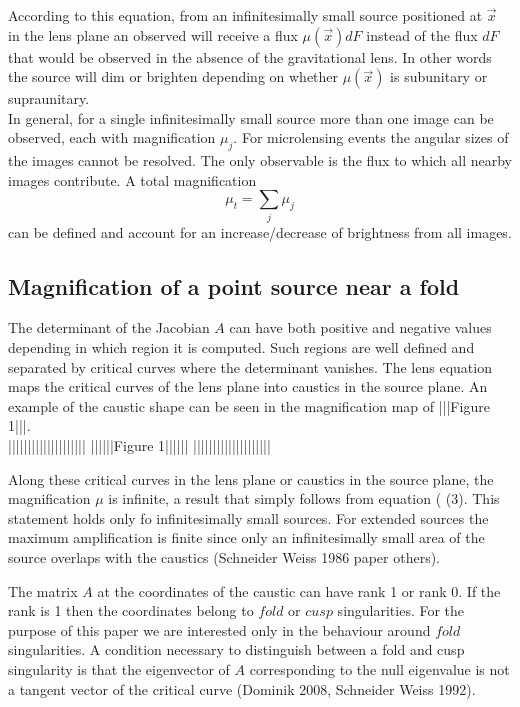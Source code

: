 According to this equation, from an infinitesimally small source positioned at $\vec{x}$ in the lens plane an observed will receive a flux $\mu(\vec{x}) dF$ instead of the flux $dF$ that would be
observed in the absence of the gravitational lens. In other words the source will dim or brighten depending on whether $\mu(\vec{x})$ is subunitary or supraunitary.\\

In general, for a single infinitesimally small source more than one image can be observed, each with magnification $\mu_j$. For microlensing events the angular sizes of the
images cannot be resolved. The only observable is the flux to which all nearby images contribute. A total magnification
\begin{equation}
 \mu_t = \sum_{j} \mu_j
\end{equation}
 can be defined and account for an increase/decrease of brightness from all images.


\subsection{Magnification of a point source near a fold}

The determinant of the Jacobian $A$ can have both positive and negative values depending in which region it is computed. Such regions are well defined and separated
by critical curves where the determinant vanishes. The lens equation maps the critical curves of the lens plane into caustics in the source plane. An example of the caustic 
shape can be seen in the magnification map of |||Figure 1|||.\\

||||||||||||||||||||
||||||Figure 1||||||
||||||||||||||||||||

Along these critical curves in the lens plane or caustics in the source plane,  the magnification $\mu$ is infinite, a result that simply follows from equation ( 
(3). This statement holds only fo infinitesimally small sources. For extended sources the maximum amplification is finite since only an infinitesimally small area of the source
overlaps with the caustics (Schneider Weiss 1986 paper others). 

The matrix $A$ at the coordinates of the caustic can have rank 1 or rank 0. If the rank is 1 then the coordinates belong to $fold$ or $cusp$ singularities. For the purpose 
of this paper we are interested only in the behaviour around $fold$ singularities. A condition necessary to distinguish between a fold and cusp singularity is that the
eigenvector of $A$ corresponding to the null eigenvalue is not a tangent vector of the critical curve (Dominik 2008, Schneider Weiss 1992).

